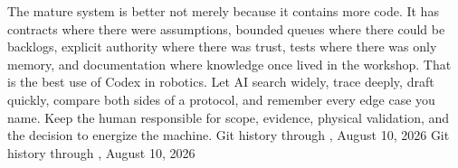 {}The mature system is better not merely because it contains more code. It has\markdownRendererSoftLineBreak
{}contracts where there were assumptions, bounded queues where there could be\markdownRendererSoftLineBreak
{}backlogs, explicit authority where there was trust, tests where there was only\markdownRendererSoftLineBreak
{}memory, and documentation where knowledge once lived in the workshop.\markdownRendererParagraphSeparator
{}That is the best use of Codex in robotics. Let AI search widely, trace deeply,\markdownRendererSoftLineBreak
{}draft quickly, compare both sides of a protocol, and remember every edge case\markdownRendererSoftLineBreak
{}you name. Keep the human responsible for scope, evidence, physical validation,\markdownRendererSoftLineBreak
{}and the decision to energize the machine.\markdownRendererInterblockSeparator
{}\markdownRendererThematicBreak{}\markdownRendererInterblockSeparator
{}
\markdownRendererSectionEnd \markdownRendererSectionBegin
{}\markdownRendererInterblockSeparator
{}\markdownRendererSectionBegin
{}\markdownRendererInterblockSeparator
{}\markdownRendererUlBegin
\markdownRendererUlItem {} Git history through , August 10, 2026\markdownRendererUlItemEnd 
\markdownRendererUlItem {} Git history through , August 10, 2026\markdownRendererUlItemEnd 
\markdownRendererUlItem {}\markdownRendererUlItemEnd 
\markdownRendererUlItem {}\markdownRendererUlItemEnd 
\markdownRendererUlItem {}\markdownRendererUlItemEnd 
\markdownRendererUlItem {}\markdownRendererUlItemEnd 
\markdownRendererUlItem {}\markdownRendererUlItemEnd 
\markdownRendererUlItem {}\markdownRendererUlItemEnd 
\markdownRendererUlItem {}\markdownRendererUlItemEnd 
\markdownRendererUlItem {}\markdownRendererUlItemEnd 
\markdownRendererUlItem {}\markdownRendererUlItemEnd 
\markdownRendererUlItem {}\markdownRendererUlItemEnd 
